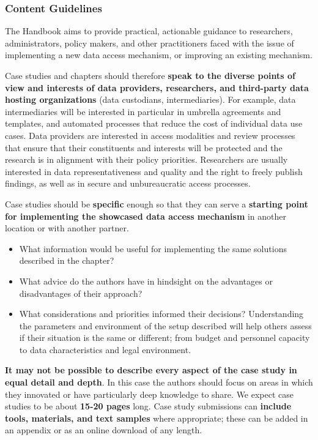 \documentclass[
]{WileySix}
\providecommand{\tightlist}{%
  \setlength{\itemsep}{0pt}\setlength{\parskip}{0pt}}
\begin{document}
\hypertarget{content-guidelines}{%
\subsubsection*{Content Guidelines}\label{content-guidelines}}

The Handbook aims to provide practical, actionable guidance to researchers, administrators, policy makers, and other practitioners faced with the issue of implementing a new data access mechanism, or improving an existing mechanism.

Case studies and chapters should therefore \textbf{speak to the diverse points of view and interests of data providers, researchers, and third-party data hosting organizations} (data custodians, intermediaries). For example, data intermediaries will be interested in particular in umbrella agreements and templates, and automated processes that reduce the cost of individual data use cases. Data providers are interested in access modalities and review processes that ensure that their constituents and interests will be protected and the research is in alignment with their policy priorities. Researchers are usually interested in data representativeness and quality and the right to freely publish findings, as well as in secure and unbureaucratic access processes.

Case studies should be \textbf{specific} enough so that they can serve a \textbf{starting point for implementing the showcased data access mechanism} in another location or with another partner.

\begin{itemize}
\tightlist
\item
  What information would be useful for implementing the same solutions described in the chapter?
\item
  What advice do the authors have in hindsight on the advantages or disadvantages of their approach?
\item
  What considerations and priorities informed their decisions? Understanding the parameters and environment of the setup described will help others assess if their situation is the same or different; from budget and personnel capacity to data characteristics and legal environment.
\end{itemize}

\textbf{It may not be possible to describe every aspect of the case study in equal detail and depth}. In this case the authors should focus on areas in which they innovated or have particularly deep knowledge to share. We expect case studies to be about \textbf{15-20 pages} long. Case study submissions can \textbf{include tools, materials, and text samples} where appropriate; these can be added in an appendix or as an online download of any length.
\end{document}
